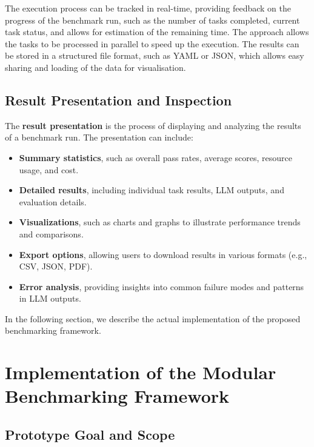 The execution process can be tracked in real-time, providing feedback on the progress of the benchmark run, such as the number of tasks completed, current task status, and allows for estimation of the remaining time.
The approach allows the tasks to be processed in parallel to speed up the execution.
The results can be stored in a structured file format, such as YAML or JSON, which allows easy sharing and loading of the data for visualisation.

\subsection{Result Presentation and Inspection}
The \textbf{result presentation} is the process of displaying and analyzing the results of a benchmark run.
The presentation can include:
\begin{itemize}
    \item \textbf{Summary statistics}, such as overall pass rates, average scores, resource usage, and cost.
    \item \textbf{Detailed results}, including individual task results, LLM outputs, and evaluation details.
    \item \textbf{Visualizations}, such as charts and graphs to illustrate performance trends and comparisons.
    \item \textbf{Export options}, allowing users to download results in various formats (e.g., CSV, JSON, PDF).
    \item \textbf{Error analysis}, providing insights into common failure modes and patterns in LLM outputs.
\end{itemize}

In the following section, we describe the actual implementation of the proposed benchmarking framework.

\section{Implementation of the Modular Benchmarking Framework}


\subsection{Prototype Goal and Scope}

